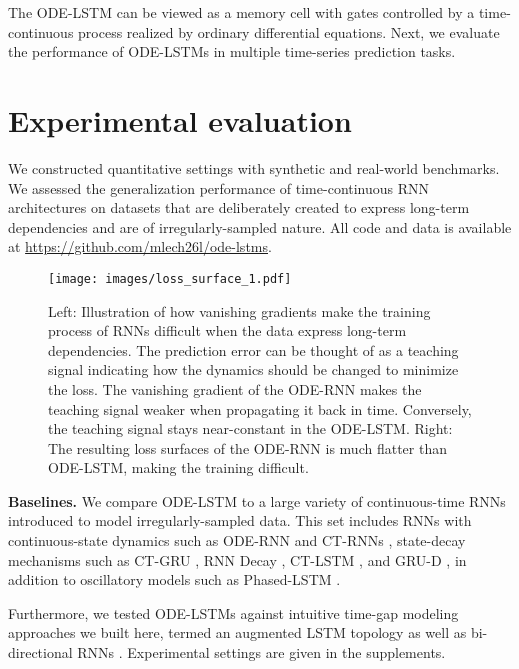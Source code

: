 \documentclass{article}
\begin{document}
The ODE-LSTM can be viewed as a memory cell with gates controlled by a time-continuous process realized by ordinary differential equations. Next, we evaluate the performance of ODE-LSTMs in multiple time-series prediction tasks. 

\section{Experimental evaluation}
We constructed quantitative settings with synthetic and real-world benchmarks. We assessed the generalization performance of time-continuous RNN architectures on datasets that are deliberately created to express long-term dependencies and are of irregularly-sampled nature. All code and data is available at \url{https://github.com/mlech26l/ode-lstms}.

\begin{figure}[t]
    \centering
    \texttt{[image: images/loss\_surface\_1.pdf]}
    \caption{Left: Illustration of how vanishing gradients make the training process of RNNs difficult when the data express long-term dependencies. The prediction error can be thought of as a teaching signal indicating how the dynamics should be changed to minimize the loss. The vanishing gradient of the ODE-RNN makes the teaching signal weaker when propagating it back in time. Conversely, the teaching signal stays near-constant in the ODE-LSTM. Right: The resulting loss surfaces of the ODE-RNN is much flatter than ODE-LSTM, making the training difficult.}
\label{fig:loss_surface}
\end{figure}


\textbf{Baselines.} We compare ODE-LSTM to a large variety of continuous-time RNNs introduced to model irregularly-sampled data. This set includes RNNs with continuous-state dynamics such as ODE-RNN \cite{rubanova2019latent} and CT-RNNs \cite{funahashi1993approximation}, state-decay mechanisms such as CT-GRU \cite{mozer2017discrete}, RNN Decay \cite{rubanova2019latent}, CT-LSTM \cite{mei2017neural}, and GRU-D \cite{che2018recurrent}, in addition to oscillatory models such as Phased-LSTM \cite{neil2016phased}. 

Furthermore, we tested ODE-LSTMs against intuitive time-gap modeling approaches we built here, termed an augmented LSTM topology as well as bi-directional RNNs \cite{schuster1997bidirectional}. Experimental settings are given in the supplements.
\end{document}
